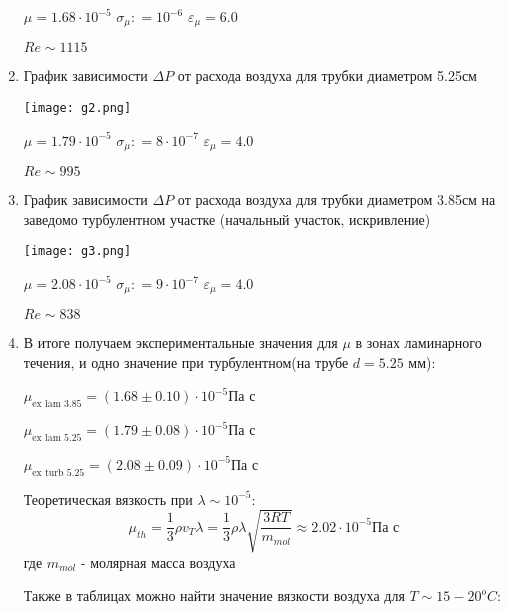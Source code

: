 \documentclass{article}
\begin{document}
\begin{enumerate}
    
    
    $\mu = 1.68 \cdot 10^{-5}$  $\sigma_{\mu}: = 10^{-6}$  $\varepsilon_{\mu} = 6.0$ 
   

    $Re \sim  1115$
    
    
    \item График зависимости $\Delta P$ от расхода воздуха для трубки диаметром 5.25см
     
    \begin{center}
    \texttt{[image: g2.png]}
    \end{center}
    
    
    $\mu = 1.79 \cdot 10^{-5}$  $\sigma_{\mu}: = 8 \cdot 10^{-7}$  $\varepsilon_{\mu} = 4.0$ 
    
    $Re \sim  995$
    
    \item График зависимости $\Delta P$ от расхода воздуха для трубки диаметром 3.85см на заведомо турбулентном участке (начальный участок, искривление)
     
    \begin{center}
    \texttt{[image: g3.png]}
    \end{center}
    
    
    $\mu = 2.08 \cdot 10^{-5}$  $\sigma_{\mu}: = 9 \cdot 10^{-7}$  $\varepsilon_{\mu} = 4.0$ 
    
    $Re \sim  838$
    
     \item В итоге получаем экспериментальные значения для $\mu$ в зонах ламинарного течения, и одно значение при турбулентном(на трубе $d = 5.25$ мм):
     
     $\mu_{\text{ex lam 3.85}} = (1.68 \pm 0.10) \cdot 10^{-5} \text{Па с}$
     
    $\mu_{\text{ex lam 5.25}} = (1.79 \pm 0.08) \cdot 10^{-5} \text{Па с}$
          
    $\mu_{\text{ex turb 5.25}} = (2.08 \pm 0.09) \cdot 10^{-5} \text{Па с}$
     
     Теоретическая вязкость при $\lambda \sim 10^{-5}$: 
        \begin{equation}
                \mu_{th} = \frac{1}{3} \rho v_T \lambda = \frac{1}{3} \rho \lambda \sqrt{\frac{3RT}{m_{mol}}} \approx  2.02 \cdot 10^{-5} \text{Па с}
        \end{equation}
        где $m_{mol}$ - молярная масса воздуха
        
    Также в таблицах можно найти значение вязкости воздуха для $T \sim 15 - 20^o C:$
    

\end{enumerate}
\end{document}
